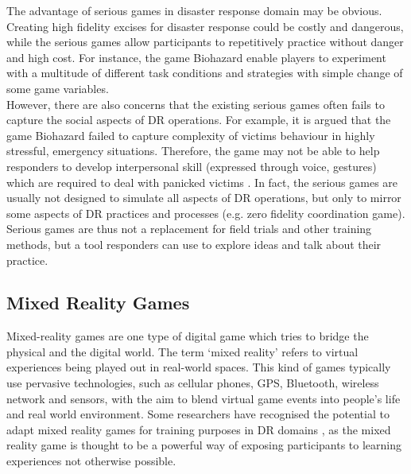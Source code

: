 The advantage of serious games in disaster response domain may be obvious. Creating high fidelity excises for disaster response could be costly and dangerous, while the serious games allow participants to repetitively practice without danger and high cost. For instance, the game Biohazard \cite{Susi2007} enable players to experiment with a multitude of different task conditions and strategies with simple change of some game variables.\\

However, there are also concerns that the existing serious games often fails to capture the social aspects of \ac{DR} operations. For example, it is argued that the game Biohazard failed to capture complexity of victims behaviour in highly stressful, emergency situations. Therefore, the game may not be able to help responders to develop interpersonal skill (expressed through voice, gestures) which are required to deal with panicked victims \cite{Susi2007}. In fact, the serious games are usually not designed to simulate all aspects of \ac{DR} operations, but only to mirror some aspects of \ac{DR} practices and processes (e.g. zero fidelity coordination game). Serious games are thus not a replacement for field trials and other training methods, but a tool responders can use to explore ideas and talk about their practice.\\


\subsection{Mixed Reality Games}
Mixed-reality games are one type of digital game which tries to bridge the physical and the digital \cite{Benford2005} world. The term `mixed reality' refers to virtual experiences being played out in real-world spaces. This kind of games typically use pervasive technologies, such as cellular phones, GPS, Bluetooth, wireless network and sensors, with the aim to blend virtual game events into people's life and real world environment. Some researchers have recognised the potential to adapt mixed reality games for training purposes in \ac{DR} domains \cite{Fischer2012}, as the mixed reality game is thought to be a powerful way of exposing participants to learning experiences not otherwise possible. \\

